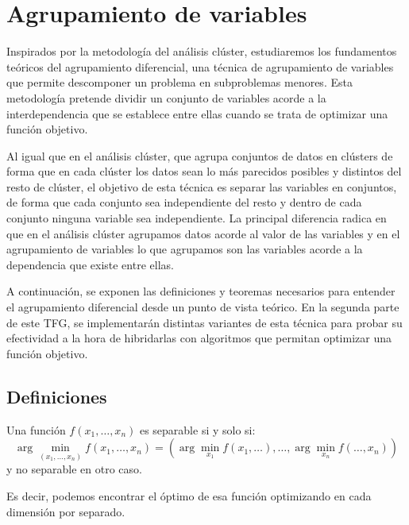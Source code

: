 
\chapter{Agrupamiento de variables}

Inspirados por la metodología del análisis clúster, estudiaremos los fundamentos teóricos del agrupamiento diferencial, una técnica de agrupamiento de variables que permite descomponer un problema en subproblemas menores. Esta metodología pretende dividir un conjunto de variables acorde a la interdependencia que se establece entre ellas cuando se trata de optimizar una función objetivo.

Al igual que en el análisis clúster, que agrupa conjuntos de datos en clústers de forma que en cada clúster los datos sean lo más parecidos posibles y distintos del resto de clúster, el objetivo de esta técnica es separar las variables en conjuntos, de forma que cada conjunto sea independiente del resto y dentro de cada conjunto ninguna variable sea independiente. La principal diferencia radica en que en el análisis clúster agrupamos datos acorde al valor de las variables y en el agrupamiento de variables lo que agrupamos son las variables acorde a la dependencia que existe entre ellas. 

A continuación, se exponen las definiciones y teoremas necesarios para entender el agrupamiento diferencial desde un punto de vista teórico. En la segunda parte de este TFG, se implementarán distintas variantes de esta técnica para probar su efectividad a la hora de hibridarlas con algoritmos que permitan optimizar una función objetivo.

\section{Definiciones}

\begin{definicion}
\label{D1}
Una función \( f(x_1, \ldots, x_n) \) es separable si y solo si:
\begin{equation}
\arg \min_{(x_1, \ldots, x_n)} f(x_1, \ldots, x_n) =
\left(
\arg \min_{x_1} f(x_1, \ldots), \ldots, \arg \min_{x_n} f(\ldots, x_n)
\right)
\label{EQ1}
\end{equation}
y no separable en otro caso.
\end{definicion}

Es decir, podemos encontrar el óptimo de esa función optimizando en cada dimensión por separado.

